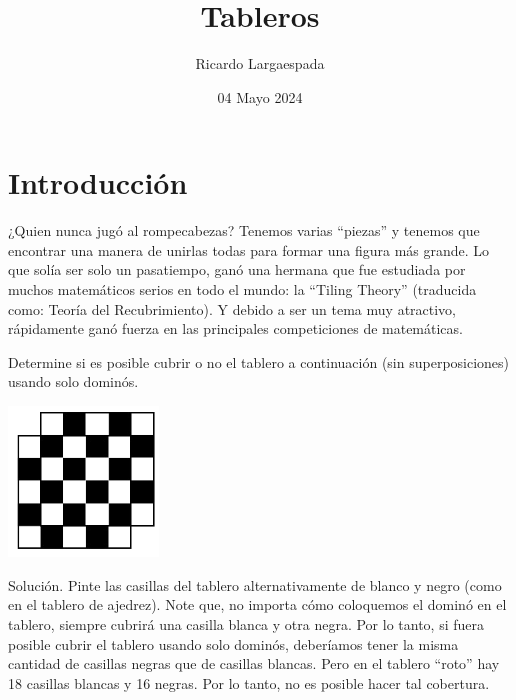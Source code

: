 \documentclass[11pt]{scrartcl}
\begin{document}
\title{Tableros}
\author{Ricardo Largaespada}
\date{04 Mayo 2024}

\maketitle
\section{Introducción}
¿Quien nunca jugó al rompecabezas? Tenemos varias ``piezas'' y tenemos que encontrar una manera de unirlas todas para formar una figura más grande. Lo que solía ser solo un pasatiempo, ganó una hermana que fue estudiada por muchos matemáticos serios en todo el mundo: la ``Tiling Theory'' (traducida como: Teoría del Recubrimiento). Y debido a ser un tema muy atractivo, rápidamente ganó fuerza en las principales competiciones de matemáticas.

\begin{example}
Determine si es posible cubrir o no el tablero a continuación (sin superposiciones) usando solo dominós.
\begin{center}
    \includegraphics[width=4cm]{images/clase_combi_centro_09_chess_board_no_coners.png}
\end{center}
\end{example}
Solución. Pinte las casillas del tablero alternativamente de blanco y negro (como en el tablero de ajedrez). Note que, no importa cómo coloquemos el dominó en el tablero, siempre cubrirá una casilla blanca y otra negra. Por lo tanto, si fuera posible cubrir el tablero usando solo dominós, deberíamos tener la misma cantidad de casillas negras que de casillas blancas. Pero en el tablero ``roto'' hay 18 casillas blancas y 16 negras. Por lo tanto, no es posible hacer tal cobertura.
\end{document}
